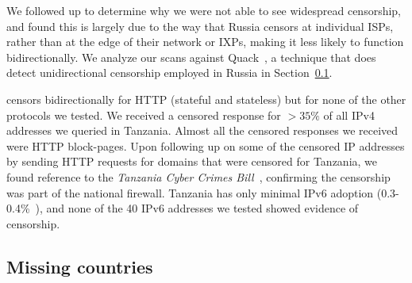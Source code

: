 We followed up to determine why we were not able to see widespread censorship,
and found this is largely due to the way that Russia censors at individual ISPs,
rather than at the edge of their network or IXPs, making it less likely to
function bidirectionally. We analyze our scans against
Quack~\cite{vandersloot2018quack}, a technique that does
detect unidirectional censorship employed in Russia in
Section~\ref{sec:compare}.


 censors bidirectionally for HTTP (stateful and stateless) but
for none of the other protocols we tested. We received a censored response for
$>35\%$ of all IPv4 addresses we queried in Tanzania. Almost all the censored
responses we received were HTTP block-pages. Upon following up on some of the
censored IP addresses by sending HTTP requests for domains that were censored
for Tanzania, we found reference to the \textit{Tanzania Cyber Crimes
Bill}~\cite{Tanzania45:online}, confirming the censorship was part of the
national firewall. Tanzania has only minimal IPv6 adoption
(0.3-0.4\%~\cite{akamai-ipv6,Google-IPv6}), and none of the 40 IPv6 addresses we
tested showed evidence of censorship.

%

%


\subsection{Missing countries}
\label{sec:compare}


